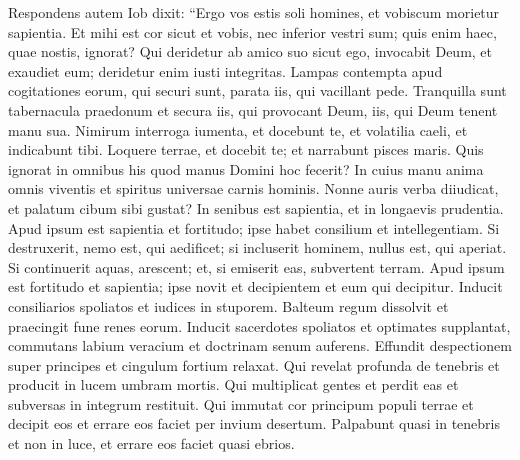 \begin{biblechapter}  
\verse Respondens autem Iob dixit: 
\verse “Ergo vos estis soli homines, et vobiscum morietur sapientia. 
\verse Et mihi est cor sicut et vobis, nec inferior vestri sum; quis enim haec, quae nostis, ignorat? 
\verse Qui deridetur ab amico suo sicut ego, invocabit Deum, et exaudiet eum; deridetur enim iusti integritas. 
\verse Lampas contempta apud cogitationes eorum, qui securi sunt, parata iis, qui vacillant pede. 
\verse Tranquilla sunt tabernacula praedonum et secura iis, qui provocant Deum, iis, qui Deum tenent manu sua. 
\verse Nimirum interroga iumenta, et docebunt te, et volatilia caeli, et indicabunt tibi. 
\verse Loquere terrae, et docebit te; et narrabunt pisces maris. 
\verse Quis ignorat in omnibus his quod manus Domini hoc fecerit? 
\verse In cuius manu anima omnis viventis et spiritus universae carnis hominis. 
\verse Nonne auris verba diiudicat, et palatum cibum sibi gustat? 
\verse In senibus est sapientia, et in longaevis prudentia. 
\verse Apud ipsum est sapientia et fortitudo; ipse habet consilium et intellegentiam. 
\verse Si destruxerit, nemo est, qui aedificet; si incluserit hominem, nullus est, qui aperiat. 
\verse Si continuerit aquas, arescent; et, si emiserit eas, subvertent terram. 
\verse Apud ipsum est fortitudo et sapientia; ipse novit et decipientem et eum qui decipitur. 
\verse Inducit consiliarios spoliatos et iudices in stuporem. 
\verse Balteum regum dissolvit et praecingit fune renes eorum. 
\verse Inducit sacerdotes spoliatos et optimates supplantat, 
\verse commutans labium veracium et doctrinam senum auferens. 
\verse Effundit despectionem super principes et cingulum fortium relaxat. 
\verse Qui revelat profunda de tenebris et producit in lucem umbram mortis. 
\verse Qui multiplicat gentes et perdit eas et subversas in integrum restituit. 
\verse Qui immutat cor principum populi terrae et decipit eos et errare eos faciet per invium desertum. 
\verse Palpabunt quasi in tenebris et non in luce, et errare eos faciet quasi ebrios. 
\end{biblechapter}

